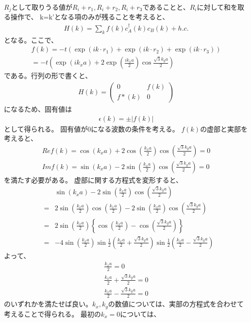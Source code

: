 \documentclass{article}
\begin{document}
$R_j$として取りうる値が$R_i+r_1,R_i+r_2,R_i+r_3$であることと、$R_i$に対して和を取る操作で、
k=k'となる項のみが残ることを考えると、
\begin{eqnarray}
H(k)=\sum_{k} f(k) c_A^\dagger(k)c_B(k) +h.c.
\end{eqnarray}
となる。ここで、
\begin{eqnarray}
f(k)=-t(\exp(ik\cdot r_1)+\exp(ik\cdot r_2)+\exp(ik\cdot r_3)) \\
=-t(\exp(ik_x a)+2\exp(\frac{ik_x a}{2})\cos{\frac{\sqrt{3}k_y a}{2}})
\end{eqnarray}
である。行列の形で書くと、
\begin{eqnarray}
H(k)=\left( 
 \begin{array}{cc}
	0 & f(k) \\
	f*(k) & 0
 \end{array}
\right)
\end{eqnarray}
になるため、固有値は
\begin{eqnarray}
\epsilon(k)=\pm |f(k)|
\end{eqnarray}
として得られる。
固有値が0になる波数の条件を考える。
$f(k)$の虚部と実部を考えると、
\begin{eqnarray}
Re f(k)=\cos(k_x a)+2\cos(\frac{k_x a}{2})\cos(\frac{\sqrt{3}k_y a}{2}) =0 \\
Im f(k)=\sin(k_x a)-2\sin(\frac{k_x a}{2})\cos(\frac{\sqrt{3}k_y a}{2}) =0
\end{eqnarray}
を満たす必要がある。
虚部に関する方程式を変形すると、
\begin{eqnarray}
&&\sin(k_x a)-2\sin(\frac{k_x a}{2})\cos(\frac{\sqrt{3}k_y a}{2})\\
&=&2\sin(\frac{k_x
a}{2})\cos(\frac{k_x a}{2})-2\sin(\frac{k_x a}{2})\cos(\frac{\sqrt{3}k_y a}{2})
\\
&=&2\sin(\frac{k_x a}{2})\left\{\cos(\frac{k_x a}{2})-\cos(\frac{\sqrt{3}k_y
a}{2})\right\}
\\
&=&-4\sin(\frac{k_x a}{2})\sin\frac{1}{2}(\frac{k_x a}{2}+\frac{\sqrt{3}k_y
a}{2})\sin\frac{1}{2}(\frac{k_x a}{2}-\frac{\sqrt{3}k_y
a}{2})
\end{eqnarray}
よって、
\begin{eqnarray}
\frac{k_x a}{2}=0 \\
\frac{k_x a}{2}+\frac{\sqrt{3}k_y
a}{2} =0 \\
\frac{k_x a}{2}-\frac{\sqrt{3}k_y
a}{2}=0 
\end{eqnarray}
のいずれかを満たせば良い。$k_x,k_y$の数値については、実部の方程式を合わせて考えることで得られる。
最初の$k_x=0$については、
\end{document}
